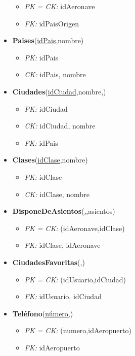 \begin{itemize}
		\begin{itemize}
			\item \textit{PK = CK: } idAeronave
			\item \textit{FK: } idPaisOrigen
		\end{itemize}
	\item \textbf{Paises}(\underline{idPais},nombre)
		\begin{itemize}
			\item \textit{PK: } idPais
			\item \textit{CK: } idPais, nombre
		\end{itemize}
	\item \textbf{Ciudades}(\underline{idCiudad},nombre,)
		\begin{itemize}
			\item \textit{PK: } idCiudad
			\item \textit{CK: } idCiudad, nombre
			\item \textit{FK: } idPais
		\end{itemize}
	\item \textbf{Clases}(\underline{idClase},nombre)
		\begin{itemize}
			\item \textit{PK: } idClase
			\item \textit{CK: } idClase, nombre
		\end{itemize}
	\item \textbf{DisponeDeAsientos}(\underline{,},asientos)
		\begin{itemize}
			\item \textit{PK = CK: } (idAeronave,idClase)
			\item \textit{FK: } idClase, idAeronave	
		\end{itemize}
	\item \textbf{CiudadesFavoritas}(\underline{,})
		\begin{itemize}
			\item \textit{PK = CK: } (idUsuario,idCiudad)
			\item \textit{FK: } idUsuario, idCiudad	
		\end{itemize}
	\item \textbf{Tel\'efono}(\underline{n\'umero,})
		\begin{itemize}
			\item \textit{PK = CK: } (numero,idAeropuerto)
			\item \textit{FK: } idAeropuerto
		\end{itemize}
\end{itemize}	
